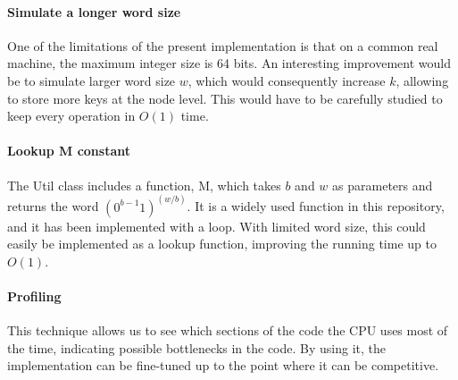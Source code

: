\paragraph*{Simulate a longer word size}
One of the limitations of the present implementation is that on a common real machine, the maximum integer size is 64 bits. An interesting improvement would be to simulate larger word size $w$, which would consequently increase $k$, allowing to store more keys at the node level. This would have to be carefully studied to keep every operation in $O(1)$ time.


\paragraph*{Lookup {\ttfamily M} constant}
The {\ttfamily Util} class includes a function, {\ttfamily M}, which takes $b$ and $w$ as parameters and returns the word $(0^{b-1}1)^{(w/b)}$. It is a widely used function in this repository, and it has been implemented with a loop. With limited word size, this could easily be implemented as a lookup function, improving the running time up to $O(1)$.

\paragraph*{Profiling}
This technique allows us to see which sections of the code the CPU uses most of the time, indicating possible bottlenecks in the code. By using it, the implementation can be fine-tuned up to the point where it can be competitive.